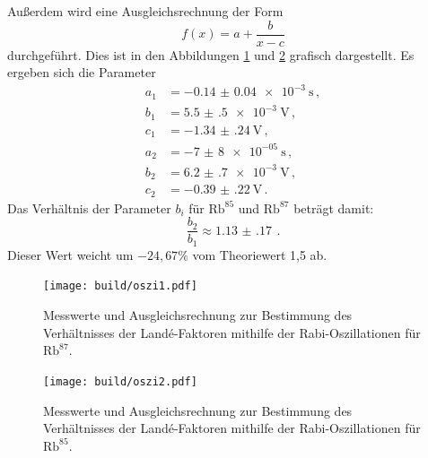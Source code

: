 Außerdem wird eine Ausgleichsrechnung der Form
\begin{equation*}
  f(x)=a+\frac{b}{x-c}
\end{equation*}
durchgeführt. Dies ist in den Abbildungen \ref{fig:oszi1} und \ref{fig:oszi2} grafisch dargestellt.
Es ergeben sich die Parameter
\begin{align*}
  a_1&=\SI{-0.14(4)e-3}{\second} \,,\\
  b_1&=\SI{5.5(5)e-3}{\volt} \,,\\
  c_1&=\SI{-1.34(24)}{\volt} \,,\\
  a_2&=\SI{-7(8)e-05}{\second} \,,\\
  b_2&=\SI{6.2(7)e-3}{\volt} \,,\\
  c_2&=\SI{-0.39(22)}{\volt} \,.
\end{align*}
Das Verhältnis der Parameter $b_i$ für $\text{Rb}^{85}$ und $\text{Rb}^{87}$ beträgt damit:
\begin{equation*}
  \frac{b_2}{b_1}\approx\SI{1.13(17)}{}\,.
\end{equation*}
Dieser Wert weicht um $-24{,}67\%$ vom Theoriewert 1{,}5 ab.
\begin{figure}
  \centering
  \texttt{[image: build/oszi1.pdf]}
  \caption{Messwerte und Ausgleichsrechnung zur Bestimmung des Verhältnisses der Landé-Faktoren mithilfe der
  Rabi-Oszillationen für $\text{Rb}^{87}$.}
  \label{fig:oszi1}
\end{figure}
\begin{figure}
  \centering
  \texttt{[image: build/oszi2.pdf]}
  \caption{Messwerte und Ausgleichsrechnung zur Bestimmung des Verhältnisses der Landé-Faktoren mithilfe der
  Rabi-Oszillationen für $\text{Rb}^{85}$.}
  \label{fig:oszi2}
\end{figure}
